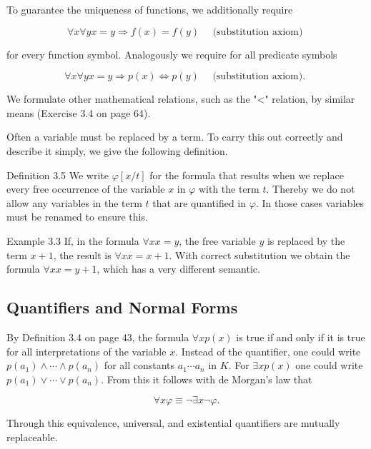 \documentclass[10pt]{book}
\begin{document}
To guarantee the uniqueness of functions, we additionally require


\begin{equation*}
\forall x \forall y x=y \Rightarrow f(x)=f(y) \quad \text { (substitution axiom) } \tag{3.2}
\end{equation*}


for every function symbol. Analogously we require for all predicate symbols


\begin{equation*}
\forall x \forall y x=y \Rightarrow p(x) \Leftrightarrow p(y) \quad \text { (substitution axiom). } \tag{3.3}
\end{equation*}


We formulate other mathematical relations, such as the "<" relation, by similar means (Exercise 3.4 on page 64).

Often a variable must be replaced by a term. To carry this out correctly and describe it simply, we give the following definition.

Definition 3.5 We write $\varphi[x / t]$ for the formula that results when we replace every free occurrence of the variable $x$ in $\varphi$ with the term $t$. Thereby we do not allow any variables in the term $t$ that are quantified in $\varphi$. In those cases variables must be renamed to ensure this.

Example 3.3 If, in the formula $\forall x x=y$, the free variable $y$ is replaced by the term $x+1$, the result is $\forall x x=x+1$. With correct substitution we obtain the formula $\forall x x=y+1$, which has a very different semantic.

\subsection*{Quantifiers and Normal Forms}
By Definition 3.4 on page 43, the formula $\forall x p(x)$ is true if and only if it is true for all interpretations of the variable $x$. Instead of the quantifier, one could write $p\left(a_{1}\right) \wedge \cdots \wedge p\left(a_{n}\right)$ for all constants $a_{1} \cdots a_{n}$ in $K$. For $\exists x p(x)$ one could write $p\left(a_{1}\right) \vee \cdots \vee p\left(a_{n}\right)$. From this it follows with de Morgan's law that

$$
\forall x \varphi \equiv \neg \exists x \neg \varphi .
$$

Through this equivalence, universal, and existential quantifiers are mutually replaceable.
\end{document}
